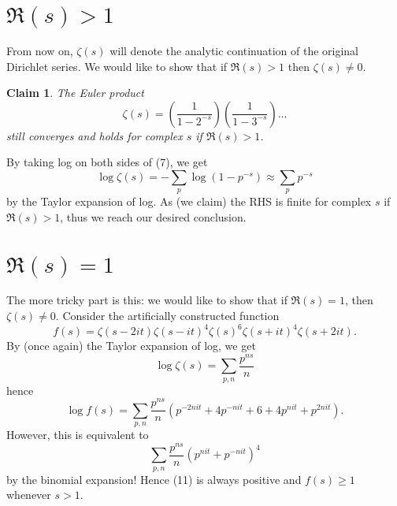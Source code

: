 \documentclass[12pt]{article}
\newtheorem{claim}{Claim}
\begin{document}
\section{$\Re(s) > 1$}
From now on, $\zeta(s)$ will denote the analytic continuation of the original Dirichlet series. We would like to show that if $\Re(s) > 1$ then $\zeta(s) \neq 0$.

\begin{claim}
    The Euler product
    \begin{equation}
        \zeta(s) = (\frac{1}{1 - 2^{-s}})(\frac{1}{1 - 3^{-s}})...
    \end{equation}
    still converges and holds for complex $s$ if $\Re(s) > 1$.
\end{claim}
By taking log on both sides of (7), we get
\begin{equation}
    \log \zeta(s) = -\sum_{p} \log(1 - p^{-s}) \approx \sum_{p}p^{-s}
\end{equation}
by the Taylor expansion of log. As (we claim) the RHS is finite for complex $s$ if $\Re(s) > 1$, thus we reach our desired conclusion.

\section{$\Re(s) = 1$}
The more tricky part is this: we would like to show that if $\Re(s) = 1$, then $\zeta(s) \neq 0$. Consider the artificially constructed function
\begin{equation}
    f(s) = \zeta(s - 2it)\zeta(s - it)^{4}\zeta(s)^{6}
    \zeta(s + it)^{4}\zeta(s + 2it).
\end{equation}
By (once again) the Taylor expansion of log, we get
\begin{equation}
    \log \zeta(s) = \sum_{p, n}\frac{p^{ns}}{n}
\end{equation}
hence
\begin{equation}
    \log f(s)
    = 
    \sum_{p,n}\frac{p^{ns}}{n}
    (
    p^{-2nit} + 4p^{-nit} + 6 + 4p^{nit} + p^{2nit} 
    ).
\end{equation}
However, this is equivalent to
\begin{equation}
    \sum_{p,n}\frac{p^{ns}}{n}(p^{nit} + p^{-nit})^{4}
\end{equation}
by the binomial expansion! Hence (11) is always positive and $f(s) \geq 1$ whenever $s > 1$.
\end{document}
